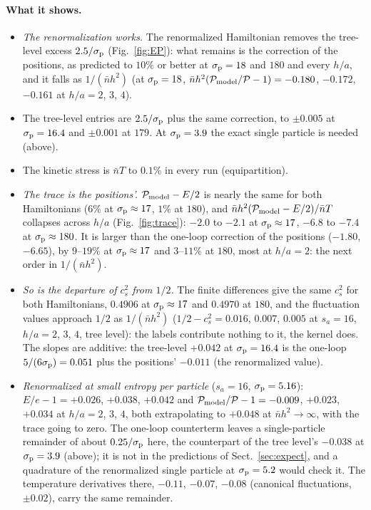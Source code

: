 \documentclass[11pt,aps,preprint,nofootinbib,superscriptaddress,tightenlines]{revtex4-2}
\def\pr{{\mathcal P}}
\def\er{e}
\def\Sect#1{Sect.~\ref{#1}}
\def\Fig#1{Fig.~\ref{#1}}
\let\oldparagraph\paragraph
\renewcommand{\paragraph}{\par\bigskip\oldparagraph}
\begin{document}
\paragraph{What it shows.}
\begin{itemize}
\item \emph{The renormalization works.}  The renormalized Hamiltonian removes the tree-level excess $2.5/\sigma_{\rm p}$ (\Fig{fig:EP}): what remains is the correction of the
  positions, as predicted to $10\%$ or better at $\sigma_{\rm p}=18$ and $180$ and every $h/a$, and it falls as $1/(\bar nh^2)$ (at $\sigma_{\rm p}=18$,
  $\bar nh^2(\pr_{\rm model}/\pr-1)=-0.180$, $-0.172$, $-0.161$ at $h/a=2$, $3$, $4$).
\item The tree-level entries are $2.5/\sigma_{\rm p}$ plus the same correction, to $\pm0.005$ at $\sigma_{\rm p}=16.4$ and $\pm0.001$ at $179$.  At $\sigma_{\rm p}=3.9$ the
  exact single particle is needed (above).
\item The kinetic stress is $\bar nT$ to $0.1\%$ in every run (equipartition).
\item \emph{The trace is the positions'.}  $\pr_{\rm model}-E/2$ is nearly the same for both Hamiltonians ($6\%$ at $\sigma_{\rm p}\approx17$, $1\%$ at $180$), and $\bar nh^2(\pr_{\rm model}-E/2)/\bar nT$ collapses across
  $h/a$ (\Fig{fig:trace}): $-2.0$ to $-2.1$ at $\sigma_{\rm p}\approx17$, $-6.8$ to $-7.4$ at $\sigma_{\rm p}\approx180$.  It is larger than the one-loop
  correction of the positions ($-1.80$, $-6.65$), by $9$--$19\%$ at $\sigma_{\rm p}\approx17$ and $3$--$11\%$ at $180$, most at $h/a=2$: the next order in $1/(\bar nh^2)$.
\item \emph{So is the departure of $c_s^2$ from $1/2$.}  The finite differences give the same $c_s^2$ for both Hamiltonians, $0.4906$ at $\sigma_{\rm p}\approx17$ and $0.4970$ at
  $180$, and the fluctuation values approach $1/2$ as $1/(\bar nh^2)$ ($1/2-c_s^2=0.016$, $0.007$, $0.005$ at $s_a=16$, $h/a=2$, $3$, $4$, tree level): the labels
  contribute nothing to it, the kernel does.  The slopes are additive: the tree-level $+0.042$ at $\sigma_{\rm p}=16.4$ is the one-loop $5/(6\sigma_{\rm p})=0.051$ plus the
  positions' $-0.011$ (the renormalized value).
\item \emph{Renormalized at small entropy per particle} ($s_a=16$, $\sigma_{\rm p}=5.16$): $E/\er-1=+0.026$, $+0.038$, $+0.042$ and $\pr_{\rm model}/\pr-1=-0.009$,
  $+0.023$, $+0.034$ at $h/a=2$, $3$, $4$, both extrapolating to $+0.048$ at $\bar nh^2\to\infty$, with the trace going to zero.  The one-loop counterterm leaves
  a single-particle remainder of about $0.25/\sigma_{\rm p}$ here, the counterpart of the tree level's $-0.038$ at $\sigma_{\rm p}=3.9$ (above); it is not in the
  predictions of \Sect{sec:expect}, and a quadrature of the renormalized single particle at $\sigma_{\rm p}=5.2$ would check it.  The temperature derivatives
  there, $-0.11$, $-0.07$, $-0.08$ (canonical fluctuations, $\pm0.02$), carry the same remainder.
\end{itemize}
\end{document}
